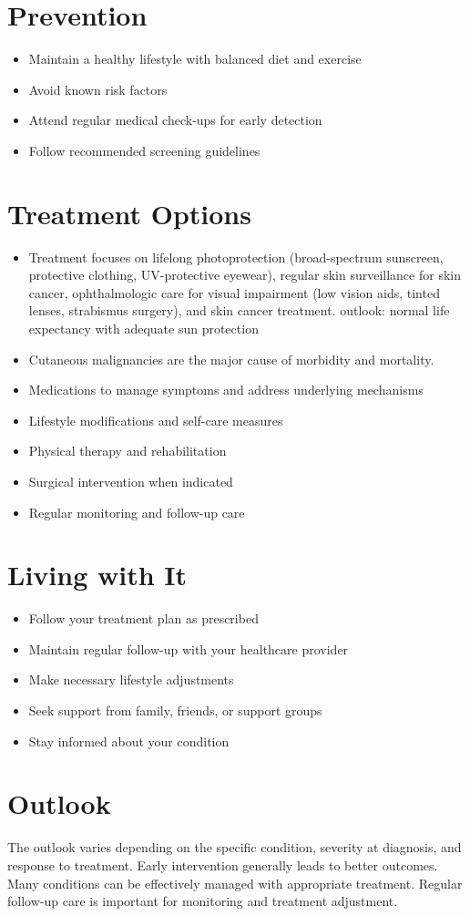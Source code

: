 \section{Prevention}
\begin{itemize}[noitemsep]
  \item Maintain a healthy lifestyle with balanced diet and exercise
  \item Avoid known risk factors
  \item Attend regular medical check-ups for early detection
  \item Follow recommended screening guidelines
\end{itemize}
\section{Treatment Options}
\begin{itemize}[noitemsep]
  \item Treatment focuses on lifelong photoprotection (broad-spectrum sunscreen, protective clothing, UV-protective eyewear), regular skin surveillance for skin cancer, ophthalmologic care for visual impairment (low vision aids, tinted lenses, strabismus surgery), and skin cancer treatment. outlook: normal life expectancy with adequate sun protection
  \item Cutaneous malignancies are the major cause of morbidity and mortality.
  \item Medications to manage symptoms and address underlying mechanisms
  \item Lifestyle modifications and self-care measures
  \item Physical therapy and rehabilitation
  \item Surgical intervention when indicated
  \item Regular monitoring and follow-up care
\end{itemize}
\section{Living with It}
\begin{itemize}[noitemsep]
  \item Follow your treatment plan as prescribed
  \item Maintain regular follow-up with your healthcare provider
  \item Make necessary lifestyle adjustments
  \item Seek support from family, friends, or support groups
  \item Stay informed about your condition
\end{itemize}
\section{Outlook}
The outlook varies depending on the specific condition, severity at diagnosis, and response to treatment. Early intervention generally leads to better outcomes. Many conditions can be effectively managed with appropriate treatment. Regular follow-up care is important for monitoring and treatment adjustment.
